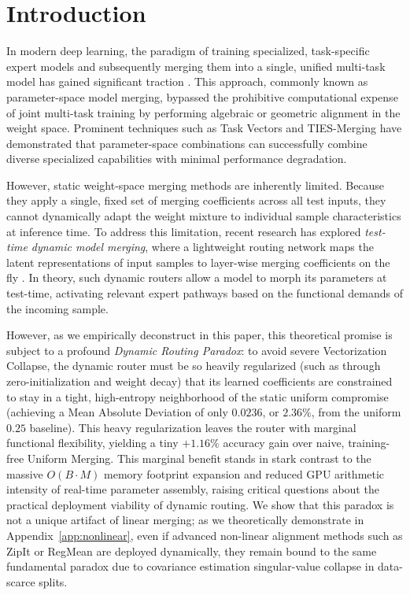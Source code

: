 \section{Introduction}
\label{sec:intro}

In modern deep learning, the paradigm of training specialized, task-specific expert models and subsequently merging them into a single, unified multi-task model has gained significant traction \cite{ilharco2022editing, wortsman2022robust}. This approach, commonly known as parameter-space model merging, bypassed the prohibitive computational expense of joint multi-task training by performing algebraic or geometric alignment in the weight space. Prominent techniques such as Task Vectors \cite{ilharco2022editing} and TIES-Merging \cite{yadav2023ties} have demonstrated that parameter-space combinations can successfully combine diverse specialized capabilities with minimal performance degradation.

However, static weight-space merging methods are inherently limited. Because they apply a single, fixed set of merging coefficients across all test inputs, they cannot dynamically adapt the weight mixture to individual sample characteristics at inference time. To address this limitation, recent research has explored \emph{test-time dynamic model merging}, where a lightweight routing network maps the latent representations of input samples to layer-wise merging coefficients on the fly \cite{muqeeth2023l3, qwsmerge2025}. In theory, such dynamic routers allow a model to morph its parameters at test-time, activating relevant expert pathways based on the functional demands of the incoming sample.

However, as we empirically deconstruct in this paper, this theoretical promise is subject to a profound \emph{Dynamic Routing Paradox}: to avoid severe Vectorization Collapse, the dynamic router must be so heavily regularized (such as through zero-initialization and weight decay) that its learned coefficients are constrained to stay in a tight, high-entropy neighborhood of the static uniform compromise (achieving a Mean Absolute Deviation of only $0.0236$, or $2.36\%$, from the uniform $0.25$ baseline). This heavy regularization leaves the router with marginal functional flexibility, yielding a tiny $+1.16\%$ accuracy gain over naive, training-free Uniform Merging. This marginal benefit stands in stark contrast to the massive $O(B \cdot M)$ memory footprint expansion and reduced GPU arithmetic intensity of real-time parameter assembly, raising critical questions about the practical deployment viability of dynamic routing. We show that this paradox is not a unique artifact of linear merging; as we theoretically demonstrate in Appendix~\ref{app:nonlinear}, even if advanced non-linear alignment methods such as ZipIt or RegMean are deployed dynamically, they remain bound to the same fundamental paradox due to covariance estimation singular-value collapse in data-scarce splits.

